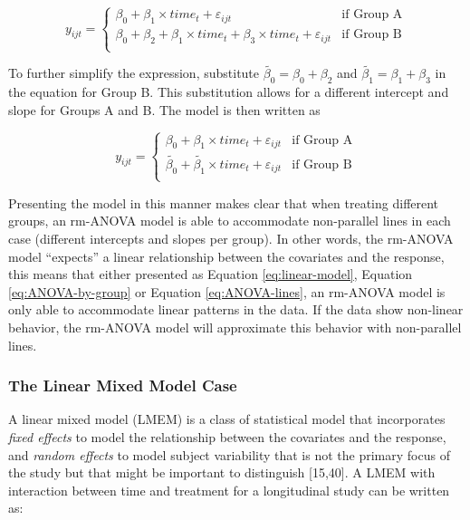 \documentclass[
]{article}
\begin{document}
\begin{equation}
y_{ijt} = \begin{cases}
\beta_0 + \beta_1\times time_{t}+\varepsilon_{ijt}   & \mbox{if Group A}\\
\beta_0 + \beta_2+\beta_1 \times time_{t} +\beta_3 \times time_{t}+\varepsilon_{ijt}  & \mbox{if Group B}\\
\end{cases}
\label{eq:ANOVA-by-group}
\end{equation}

To further simplify the expression, substitute \(\widetilde{\beta_{0}}=\beta_0+\beta_{2}\) and \(\widetilde{\beta_{1}}=\beta_{1}+\beta_{3}\) in the equation for Group B. This substitution allows for a different intercept and slope for Groups A and B. The model is then written as

\begin{equation}
y_{ijt} = \begin{cases}
\beta_0 + \beta_1\times time_{t}+\varepsilon_{ijt}   & \mbox{if Group A}\\
\widetilde{\beta_{0}} + \widetilde{\beta_1} \times time_{t}+\varepsilon_{ijt}  & \mbox{if Group B}\\
\end{cases}
\label{eq:ANOVA-lines}
\end{equation}

Presenting the model in this manner makes clear that when treating different groups, an rm-ANOVA model is able to accommodate non-parallel lines in each case (different intercepts and slopes per group). In other words, the rm-ANOVA model ``expects'' a linear relationship between the covariates and the response, this means that either presented as Equation \eqref{eq:linear-model}, Equation \eqref{eq:ANOVA-by-group} or Equation \eqref{eq:ANOVA-lines}, an rm-ANOVA model is only able to accommodate linear patterns in the data. If the data show non-linear behavior, the rm-ANOVA model will approximate this behavior with non-parallel lines.

\hypertarget{the-linear-mixed-model-case}{%
\subsubsection{The Linear Mixed Model Case}\label{the-linear-mixed-model-case}}

A linear mixed model (LMEM) is a class of statistical model that incorporates \emph{fixed effects} to model the relationship between the covariates and the response, and \emph{random effects} to model subject variability that is not the primary focus of the study but that might be important to distinguish {[}15,40{]}. A LMEM with interaction between time and treatment for a longitudinal study can be written as:
\end{document}
